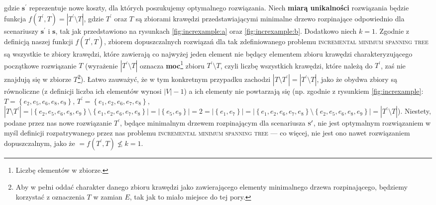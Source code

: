 gdzie $\textbf{s}^{\prime}$ reprezentuje nowe koszty, dla których poszukujemy optymalnego rozwiązania. Niech \textbf{miarą unikalności} rozwiązania będzie funkcja $f \left( T^{\prime}, T \right) = \left| T^{\prime} \setminus T \right|$, gdzie $T^{\prime}$ oraz $T$ są zbiorami krawędzi przedstawiającymi minimalne drzewo rozpinające odpowiednio dla scenariuszy $\textbf{s}^{\prime}$ i $\textbf{s}$, tak jak przedstawiono na rysunkach \ref{fig:increxample:a} oraz \ref{fig:increxample:b}. Dodatkowo niech $k = 1$. Zgodnie z definicją naszej funkcji $f \left( T^{\prime}, T \right)$, zbiorem dopuszczalnych rozwiązań dla tak zdefiniowanego problemu \textsc{incremental minimum spanning tree} są wszystkie te zbiory krawędzi, które zawierają co najwyżej jeden element nie będący elementem zbioru krawędzi charakteryzującego początkowe rozwiązanie $T$ (wyrażenie $\left| T^{\prime} \setminus T \right|$ oznacza \textbf{moc}\footnote{Liczbę elementów w zbiorze.} zbioru $T^{\prime} \setminus T$, czyli liczbę wszystkich krawędzi, które należą do $T^{\prime}$, zaś nie znajdują się w zbiorze $T$\footnote{Aby w pełni oddać charakter danego zbioru krawędzi jako zawierającego elementy minimalnego drzewa rozpinającego, będziemy korzystać z oznaczenia $T$ w zamian $E$, tak jak to miało miejsce do tej pory.}). Łatwo zauważyć, że w tym konkretnym przypadku zachodzi $\left| T \setminus T^{\prime} \right| = \left| T^{\prime} \setminus T \right|$, jako że obydwa zbiory są równoliczne (z definicji liczba ich elementów wynosi $\left| V \right| - 1$) a ich elementy nie powtarzają się (np. zgodnie z rysunkiem \ref{fig:increxample}: $T = \left\{ e_{2}, e_{5}, e_{6}, e_{8}, e_{9} \right\}$, $T^{\prime} = \left\{ e_{1}, e_{2}, e_{6}, e_{7}, e_{8} \right\}$, $\left| T \setminus T^{\prime} \right| = \left| \left\{ e_{2}, e_{5}, e_{6}, e_{8}, e_{9} \right\} \setminus \left\{ e_{1}, e_{2}, e_{6}, e_{7}, e_{8} \right\} \right| = \left| \left\{ e_{5}, e_{9} \right\} \right| = 2 = \left| \left\{ e_{1}, e_{7} \right\} \right| = \left| \left\{ e_{1}, e_{2}, e_{6}, e_{7}, e_{8} \right\} \setminus \left\{ e_{2}, e_{5}, e_{6}, e_{8}, e_{9} \right\} \right| = \left| T^{\prime} \setminus T \right|$). Niestety, podane przez nas nowe rozwiązanie $T^{\prime}$, będące minimalnym drzewem rozpinającym dla scenariusza $\textsc{s}^{\prime}$, nie jest optymalnym rozwiązaniem w myśl definicji rozpatrywanego przez nas problemu \textsc{incremental minimum spanning tree} --- co więcej, nie jest ono nawet rozwiązaniem dopuszczalnym, jako że $ = f \left( T^{\prime}, T \right) \nleqslant k = 1$.


